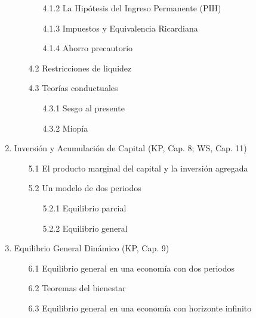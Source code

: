 \documentclass[12pt]{article}
\begin{document}
\begin{enumerate}
\begin{enumerate}
\begin{enumerate}
             \item[4.1.2] La Hipótesis del Ingreso Permanente (PIH)
             \item[4.1.3] Impuestos y Equivalencia Ricardiana
             \item[4.1.4] Ahorro precautorio
         \end{enumerate}
         \item[4.2] Restricciones de liquidez
         \item [4.3] Teorías conductuales
         \begin{enumerate}
             \item[4.3.1] Sesgo al presente
             \item[4.3.2] Miopía
         \end{enumerate}
     \end{enumerate}
     \item Inversión y Acumulación de Capital (KP, Cap. 8; WS, Cap. 11)
     \begin{enumerate}
         \item[5.1] El producto marginal del capital y la inversión agregada
         \item[5.2] Un modelo de dos periodos
         \begin{enumerate}
             \item[5.2.1] Equilibrio parcial
             \item[5.2.2] Equilibrio general
         \end{enumerate}
     \end{enumerate}
     \item Equilibrio General Dinámico (KP, Cap. 9)
     \begin{enumerate}
         \item[6.1] Equilibrio general en una economía con dos periodos
         \item[6.2] Teoremas del bienestar
         \item[6.3] Equilibrio general en una economía con horizonte infinito
     \end{enumerate}
 \end{enumerate}
\end{document}
